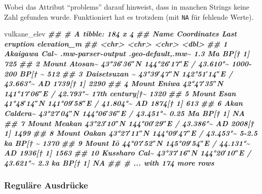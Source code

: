 \documentclass[
  ngerman,
]{article}
\newenvironment{Shaded}{\begin{snugshade}}{\end{snugshade}}
\newcommand{\DocumentationTok}[1]{\textcolor[rgb]{0.56,0.35,0.01}{\textbf{\textit{#1}}}}
\newcommand{\NormalTok}[1]{#1}
\begin{document}
Wobei das Attribut ``problems'' darauf hinweist, dass in manchen Strings keine Zahl gefunden wurde. Funktioniert hat es trotzdem (mit \texttt{NA} für fehlende Werte).

\begin{Shaded}
\begin{Highlighting}[]
\NormalTok{vulkane\_elev}
\DocumentationTok{\#\# \# A tibble: 184 x 4}
\DocumentationTok{\#\#    Name          Coordinates                         \textasciigrave{}Last eruption\textasciigrave{} elevation\_m}
\DocumentationTok{\#\#    \textless{}chr\textgreater{}         \textless{}chr\textgreater{}                               \textless{}chr\textgreater{}                 \textless{}dbl\textgreater{}}
\DocumentationTok{\#\#  1 Akaigawa Cal\textasciitilde{} .mw{-}parser{-}output .geo{-}default,.mw\textasciitilde{} 1.3 Ma BP[† 1]          725}
\DocumentationTok{\#\#  2 Mount Atosan\textasciitilde{} 43°36′36″N 144°26′17″E﻿ / ﻿43.610°\textasciitilde{}   1000{-}200 BP[† \textasciitilde{}         512}
\DocumentationTok{\#\#  3 Daisetsuzan \textasciitilde{} 43°39′47″N 142°51′14″E﻿ / ﻿43.663°\textasciitilde{}   AD 1739[† 1]           2290}
\DocumentationTok{\#\#  4 Mount Eniwa   42°47′35″N 141°17′06″E﻿ / ﻿42.793°\textasciitilde{}   17th century[†\textasciitilde{}        1320}
\DocumentationTok{\#\#  5 Mount Esan    41°48′14″N 141°09′58″E﻿ / ﻿41.804°\textasciitilde{}   AD 1874[† 1]            613}
\DocumentationTok{\#\#  6 Akan Caldera\textasciitilde{} 43°27′04″N 144°06′36″E﻿ / ﻿43.451°\textasciitilde{}   0.25 Ma BP[† 1]          NA}
\DocumentationTok{\#\#  7 Mount Meakan  43°23′10″N 144°00′29″E﻿ / ﻿43.386°\textasciitilde{}   AD 2008[† 1]           1499}
\DocumentationTok{\#\#  8 Mount Oakan   43°27′11″N 144°09′47″E﻿ / ﻿43.453°\textasciitilde{}   5{-}2.5 ka BP[† \textasciitilde{}        1370}
\DocumentationTok{\#\#  9 Mount Iō      44°07′52″N 145°09′54″E﻿ / ﻿44.131°\textasciitilde{}   AD 1936[† 1]           1563}
\DocumentationTok{\#\# 10 Kussharo Cal\textasciitilde{} 43°37′16″N 144°20′10″E﻿ / ﻿43.621°\textasciitilde{}   2.3 ka BP[† 1]           NA}
\DocumentationTok{\#\# \# ... with 174 more rows}
\end{Highlighting}
\end{Shaded}

\hypertarget{reguluxe4re-ausdruxfccke}{%
\subsubsection{Reguläre Ausdrücke}\label{reguluxe4re-ausdruxfccke}}
\end{document}
